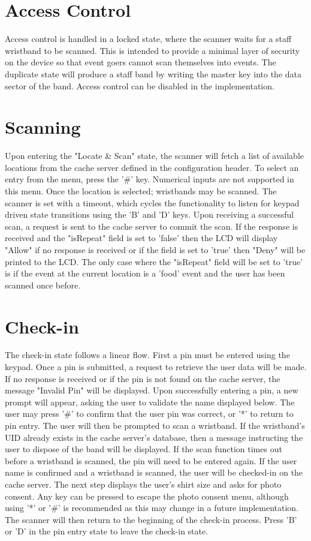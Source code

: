 \documentclass{article}
\begin{document}
\section{Access Control}
Access control is handled in a locked state, where the scanner waits for a staff wristband to be scanned.  This is intended to provide a minimal layer of security on the device so that event goers cannot scan themselves into events.  The duplicate state will produce a staff band by writing the master key into the data sector of the band.  Access control can be disabled in the implementation.

\section{Scanning}
Upon entering the "Locate \& Scan" state, the scanner will fetch a list of available locations from the cache server defined in the configuration header.  To select an entry from the menu, press the '\#' key. Numerical inputs are not supported in this menu.  Once the location is selected; wristbands may be scanned.  The scanner is set with a timeout, which cycles the functionality to listen for keypad driven state transitions using the 'B' and 'D' keys.  Upon receiving a successful scan, a request is sent to the cache server to commit the scan.  If the response is received and the "isRepeat" field is set to 'false' then the LCD will display "Allow" if no response is received or if the field is set to 'true' then "Deny" will be printed to the LCD.  The only case where the "isRepeat" field will be set to 'true' is if the event at the current location is a 'food' event and the user has been scanned once before.  

\section{Check-in}
The check-in state follows a linear flow.  First a pin must be entered using the keypad.  Once a pin is submitted, a request to retrieve the user data will be made.  If no response is received or if the pin is not found on the cache server, the message "Invalid Pin" will be displayed.  Upon successfully entering a pin, a new prompt will appear, asking the user to validate the name displayed below.  The user may press '\#' to confirm that the user pin was correct, or '*' to return to pin entry.  The user will then be prompted to scan a wristband.  If the wristband's UID already exists in the cache server's database, then a message instructing the user to dispose of the band will be displayed.  If the scan function times out before a wristband is scanned, the pin will need to be entered again. If the user name is confirmed and a wristband is scanned, the user will be checked-in on the cache server.  The next step displays the user's shirt size and asks for photo consent.  Any key can be pressed to escape the photo consent menu, although using '*' or '\#' is recommended as this may change in a future implementation.  The scanner will then return to the beginning of the check-in process.  Press 'B' or 'D' in the pin entry state to leave the check-in state. 
\end{document}
